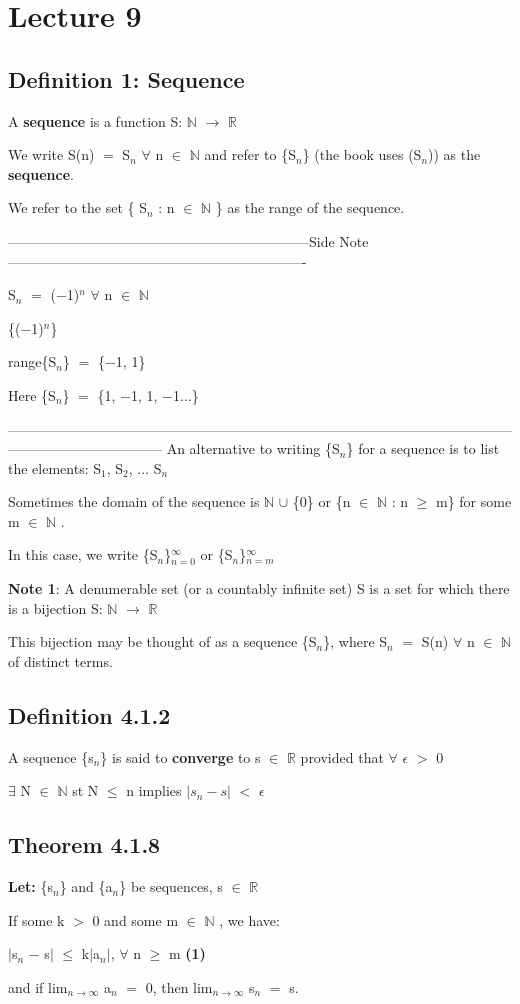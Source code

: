 \documentclass{article}
\newcommand{\mt}[1]{\ensuremath{#1}}
\newcommand\bsc[2][\DefaultOpt]{%
  \def\DefaultOpt{#2}%
  \section[#1]{#2}%
}
\newcommand\ssc[2][\DefaultOpt]{%
  \def\DefaultOpt{#2}%
  \subsection[#1]{#2}%
}
\newcommand{\lt}[1]{\textbf{Let: } #1}
\newcommand{\bpth}[1]{\textbf{(#1)}}
\newcommand{\sidenote}[1]{-----------------------------------------------------------------Side Note----------------------------------------------------------------
#1 \

---------------------------------------------------------------------------------------------------------------------------------------------}
\newcommand{\br}{\mt{\mathbb{R}} }       %
\newcommand{\bn}{\mt{\mathbb{N}} }       %
\newcommand{\ep}{\mt{\epsilon} }         %
\newcommand{\fa}{\mt{\forall} }          %
\newcommand{\mem}{\mt{\in} }
\newcommand{\exs}{\mt{\exists} }
\newcommand{\lra}{ \mt{\longrightarrow} } %
\newcommand{\eql}{\mt{=} }
\newcommand{\uw}[2]{#1\mt{_{#2}}}
\begin{document}
\bsc{Lecture 9}{

\ssc{Definition 1: Sequence}{

A \textbf{sequence} is a function S: \bn \lra \br

We write S(n) \eql \uw{S}{n} \fa n \mem \bn and refer to \{\uw{S}{n}\} (the book uses (\uw{S}{n})) as the \textbf{sequence}.

We refer to the set \{ \uw{S}{n} : n \mem \bn\} as the range of the sequence.

\sidenote{
\uw{S}{n} \eql ($-$1)$^n$ \fa n \mem \bn

\{($-$1)$^n$\}

range\{\uw{S}{n}\} \eql \{$-$1, 1\}

Here \{\uw{S}{n}\} \eql \{1, $-$1, 1, $-$1...\}
}
An alternative to writing \{\uw{S}{n}\} for a sequence is to list the elements: \uw{S}{1}, \uw{S}{2}, ... \uw{S}{n}

Sometimes the domain of the sequence is \bn $\cup$ \{0\} or \{n \mem \bn : n $\geq$ m\} for some m \mem \bn.

In this case, we write \{\uw{S}{n}\}$^\infty_{n = 0}$ or \{\uw{S}{n}\}$^\infty_{n = m}$

\textbf{Note 1}: A denumerable set (or a countably infinite set) S is a set for which there is a bijection S: \bn \lra \br

This bijection may be thought of as a sequence \{\uw{S}{n}\}, where \uw{S}{n} \eql S(n) \fa n \mem \bn of distinct terms.
}

\ssc{Definition 4.1.2}{

A sequence \{\uw{s}{n}\} is said to \textbf{converge} to s \mem \br provided that \fa \ep $>$ 0

\exs N \mem \bn st N $\leq$ n implies $|\uw{s}{n} - s|$ $<$ \ep \textrm{   } 
}

\ssc{Theorem 4.1.8}{

\lt{\{\uw{s}{n}\} and \{\uw{a}{n}\} be sequences, s \mem \br}

If some k $>$ 0 and some m \mem \bn, we have:

$|$\uw{s}{n} $-$ s$|$ $\leq$ k$|$\uw{a}{n}$|$, \fa n $\geq$ m \bpth{1}

and if lim$_{n\lra\infty}$ \uw{a}{n} \eql 0, then lim$_{n\lra\infty}$ \uw{s}{n} \eql s.

}

}

\newpage
\end{document}
